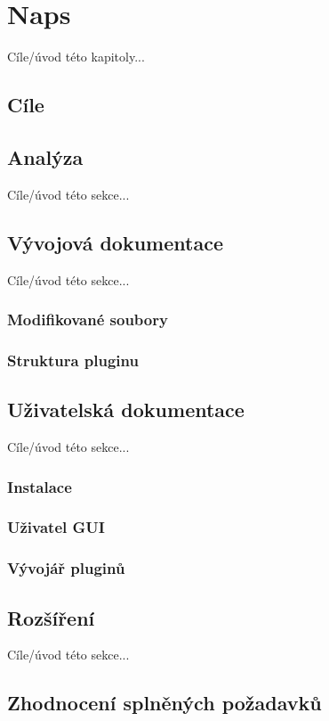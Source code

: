 \chapter{Naps}

Cíle/úvod této kapitoly...

\section{Cíle}

\section{Analýza}
Cíle/úvod této sekce...


\section{Vývojová dokumentace}
Cíle/úvod této sekce...

\subsection{Modifikované soubory}

\subsection{Struktura pluginu}

\section{Uživatelská dokumentace}
Cíle/úvod této sekce...

\subsection{Instalace}

\subsection{Uživatel GUI}

\subsection{Vývojář pluginů}

\section{Rozšíření}
Cíle/úvod této sekce...

\section{Zhodnocení splněných požadavků}